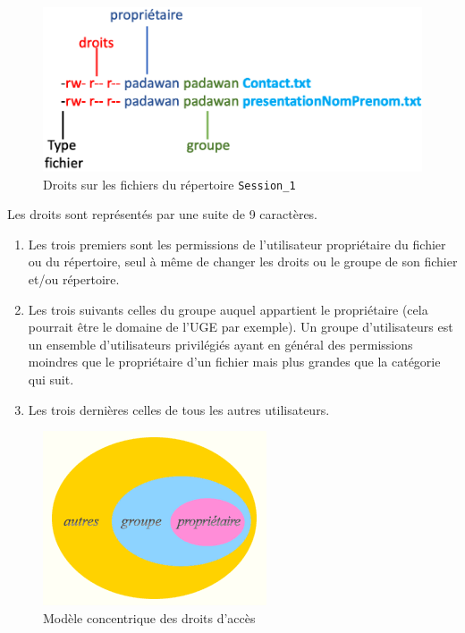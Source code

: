 \documentclass{article}
\begin{document}
\begin{exercice}
\begin{enumerate}
\begin{figure}[h!]
    \begin{center}
    \includegraphics[scale=0.2]{droitsFichier.png}
    \caption{Droits sur les fichiers du répertoire \texttt{Session\_1}}
     \end{center}
\end{figure}    

\end{enumerate}

Les droits sont représentés par une suite de 9 caractères. 

\begin{enumerate}
\item
Les trois premiers sont les permissions de l'utilisateur propriétaire du fichier ou du répertoire, seul à même de changer les droits ou le groupe de son fichier et/ou répertoire.
\item
Les trois suivants celles du groupe auquel appartient le propriétaire (cela pourrait être le domaine de l'UGE par exemple). Un groupe d'utilisateurs est un ensemble d'utilisateurs 
privilégiés ayant en général des permissions moindres que le propriétaire d'un fichier mais plus grandes que la catégorie qui suit.
\item
Les trois dernières celles de tous les autres utilisateurs.
\end{enumerate}

\begin{figure}[h!]
    \begin{center}
    \includegraphics[scale=0.6]{droits2.png}
    \caption{Modèle concentrique des droits d'accès}
     \end{center}
\end{figure}    


\end{exercice}
\end{document}
